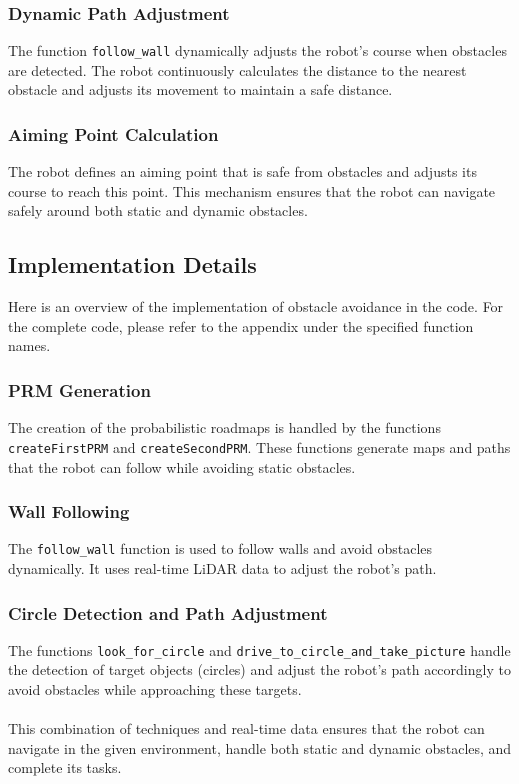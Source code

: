 \documentclass{article}
\begin{document}
	\subsubsection{Dynamic Path Adjustment}
	The function \texttt{follow\_wall} dynamically adjusts the robot's course when obstacles are detected. The robot continuously calculates the distance to the nearest obstacle and adjusts its movement to maintain a safe distance.
	
	\subsubsection{Aiming Point Calculation}
	The robot defines an aiming point that is safe from obstacles and adjusts its course to reach this point. This mechanism ensures that the robot can navigate safely around both static and dynamic obstacles.
	
	\subsection{Implementation Details}
	Here is an overview of the implementation of obstacle avoidance in the code. For the complete code, please refer to the appendix under the specified function names.
	
	\subsubsection{PRM Generation}
	The creation of the probabilistic roadmaps is handled by the functions \texttt{createFirstPRM} and \texttt{createSecondPRM}. These functions generate maps and paths that the robot can follow while avoiding static obstacles.
	
	\subsubsection{Wall Following}
	The \texttt{follow\_wall} function is used to follow walls and avoid obstacles dynamically. It uses real-time LiDAR data to adjust the robot's path.
	
	\subsubsection{Circle Detection and Path Adjustment}
	The functions \texttt{look\_for\_circle} and \texttt{drive\_to\_circle\_and\_take\_picture} handle the detection of target objects (circles) and adjust the robot's path accordingly to avoid obstacles while approaching these targets.
	\\\\
	This combination of techniques and real-time data ensures that the robot can navigate in the given environment, handle both static and dynamic obstacles, and complete its tasks.
	
\end{document}
